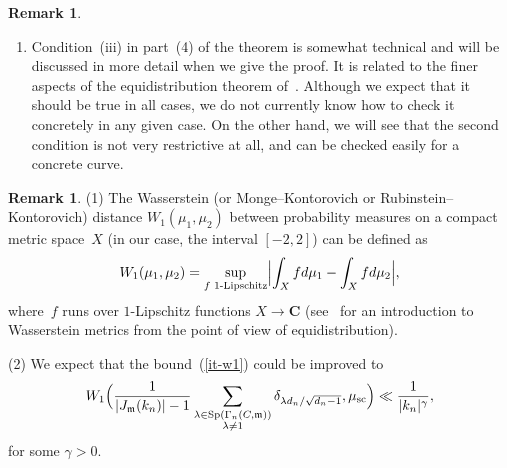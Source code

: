 \documentclass[12pt]{amsart}
\numberwithin{equation}{section}
\newcommand{\Cc}{\mathbf{C}}
\newcommand{\mfm}{\mathfrak{m}}
\theoremstyle{plain}
\theoremstyle{remark}
\theoremstyle{definition}
\newtheorem{remark}[theorem]{Remark}
\begin{document}
\begin{remark}
\begin{enumerate}
  \item Condition~(iii) in part~(4) of the theorem is somewhat technical
    and will be discussed in more detail when we give the proof. It is
    related to the finer aspects of the equidistribution theorem
    of~\cite{ffk}. Although we expect that it should be true in all
    cases, we do not currently know how to check it concretely in any
    given case. On the other hand, we will see that the second condition is not very
    restrictive at all, and can be checked easily for a concrete curve.

  \end{enumerate}
\end{remark}

\begin{remark}
  (1) The Wasserstein (or Monge--Kontorovich or Rubinstein--Kontorovich)
  distance $W_1(\mu_1,\mu_2)$ between probability measures on a compact
  metric space~$X$ (in our case, the interval $[-2,2]$) can be defined as
  \[
    W_1(\mu_1,\mu_2)=\sup_{f\text{ $1$-Lipschitz}}\Bigl|
    \int_{X}fd\mu_1-\int_Xfd\mu_2\Bigr|,
  \]
  where~$f$ runs over $1$-Lipschitz functions $X\to \Cc$ (see~\cite{k-u}
  for an introduction to Wasserstein metrics from the point of view of
  equidistribution).

  (2) We expect that the bound~(\ref{it-w1}) could be improved to
  \[
    W_1\Bigl( \frac{1}{|J_{\mfm}(k_n)|-1} \sum_{\substack{\lambda\in
        \mathrm{Sp}(\Gamma_n(C,\mfm))\\\lambda\not=1}} \delta_{\lambda
      d_n/\sqrt{d_n-1}}, \mu_{\mathrm{sc}} \Bigr) \ll
    \frac{1}{|k_n|^{\gamma}},
  \]
  for some $\gamma>0$.
\end{remark}
\end{document}
